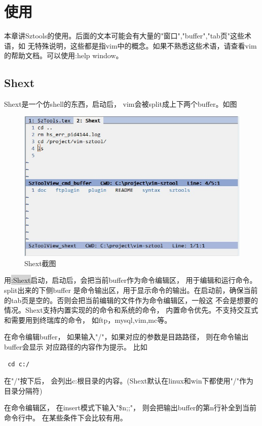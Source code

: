 \documentclass[oneside,openany]{book}
\begin{document}
\chapter{使用}
  本章讲Sztools的使用。后面的文本可能会有大量的"窗口","buffer","tab页"这些术语，如
无特殊说明，这些都是指vim中的概念。如果不熟悉这些术语，请查看vim的帮助文档。可以使用:help window。

  \section{Shext}
  Shext是一个仿shell的东西，启动后， vim会被split成上下两个buffer。如图
  \begin{figure}[htbp]%
  \centering
  \includegraphics[scale=0.5]{shext.jpg}
  \caption{Shext截图}
  \end{figure}
  

  用\colorbox{lightgray}{:Shext}启动，启动后，会把当前buffer作为命令编辑区， 用于编辑和运行命令。 split出来的下侧buffer
是命令输出区，用于显示命令的输出。在启动前，确保当前的tab页是空的。否则会把当前编辑的文件作为命令编辑区，一般这
不会是想要的情况。Shext支持内置实现的的命令和系统的命令， 内置命令优先。不支持交互式和需要用到终瑞库的命令， 如ftp，mysql,vim,mc等。 

  在命令编辑buffer， 如果输入"/"，如果对应的参数是目路路径， 则在命令输出buffer会显示
对应路径的内容作为提示。 比如 
  \begin{verbatim} cd c:/ \end{verbatim}
 在"/"按下后， 会列出c:根目录的内容。(Shext默认在linux和win下都使用"/"作为目录分隔符)

  在命令编辑区， 在insert模式下输入"\$n;;"， 则会把输出buffer的第n行补全到当前命令行中。
在某些条件下会比较有用。
\end{document}
